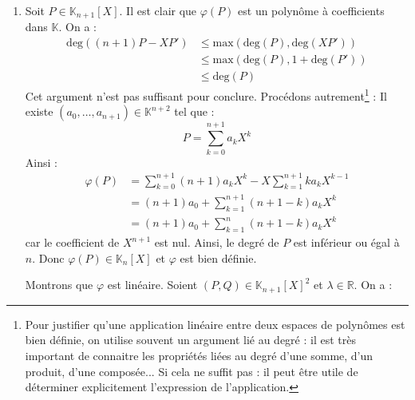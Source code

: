 \documentclass[a4paper,10pt]{report}
\begin{document}
\corr \begin{enumerate}
\item Soit $P \in \mathbb{K}_{n+1}[X]$. Il est clair que $\varphi(P)$ est un polynôme à coefficients dans $\mathbb{K}$. On a :
\begin{align*}
\textrm{deg}((n+1)P -XP') & \leq  \textrm{max}(\textrm{deg}(P), \textrm{deg}(XP')) \\
& \leq  \textrm{max}(\textrm{deg}(P), 1 +\textrm{deg}(P') ) \\
 &\leq  \textrm{deg}(P) 
\end{align*}
Cet argument n'est pas suffisant pour conclure. Procédons autrement\footnote{Pour justifier qu'une application linéaire entre deux espaces de polynômes est bien définie, on utilise souvent un argument lié au degré : il est très important de connaitre les propriétés liées au degré d'une somme, d'un produit, d'une composée... Si cela ne suffit pas : il peut être utile de déterminer explicitement l'expression de l'application.} : Il existe $(a_0, \ldots, a_{n+1}) \in \mathbb{K}^{n+2}$ tel que :
$$ P = \sum_{k=0}^{n+1} a_k X^k $$
Ainsi :
\begin{align*}
\varphi(P) & = \sum_{k=0}^{n+1} (n+1) a_k X^k - X \sum_{k=1}^{n+1} k a_k X^{k-1}  \\
& = (n+1)a_0  + \sum_{k=1}^{n+1} (n+1-k)a_k X^k  \\
& = (n+1)a_0 + \sum_{k=1}^{n} (n+1-k)a_k X^k  
\end{align*} 
car le coefficient de $X^{n+1}$ est nul. Ainsi, le degré de $P$ est inférieur ou égal à $n$. Donc $\varphi(P) \in \mathbb{K}_n[X]$ et $\varphi$ est bien définie.

\medskip

\noindent Montrons que $\varphi$ est linéaire. Soient $(P,Q) \in \mathbb{K}_{n+1}[X]^2$ et $\lambda \in \mathbb{R}$. On a :


\end{enumerate}
\end{document}
